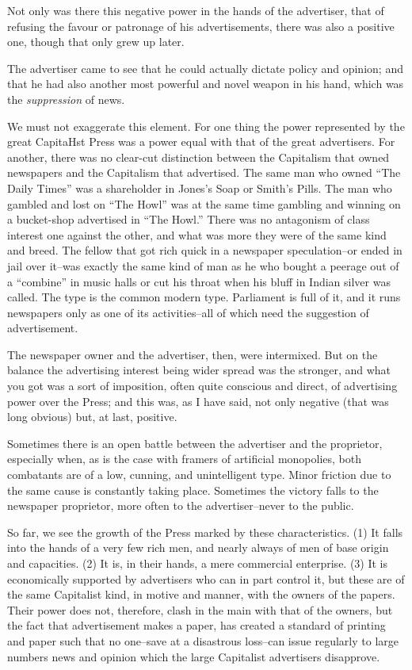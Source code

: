\documentclass{book}
\begin{document}
Not only was there this negative power in the hands of the advertiser, that of refusing the favour or patronage of his advertisements, there was also a positive one, though that only grew up later.

The advertiser came to see that he could actually dictate policy and opinion; and that he had also another most powerful and novel weapon in his hand, which was the \emph{suppression} of news.

We must not exaggerate this element. For one thing the power represented by the great CapitaHst Press was a power equal with that of the great advertisers. For another, there was no clear-cut distinction between the Capitalism that owned newspapers and the Capitalism that advertised. The same man who owned “The Daily Times” was a shareholder in Jones’s Soap or Smith’s Pills. The man who gambled and lost on “The Howl” was at the same time gambling and winning on a bucket-shop advertised in “The Howl.” There was no antagonism of class interest one against the other, and what was more they were of the same kind and breed. The fellow that got rich quick in a newspaper speculation–or ended in jail over it–was exactly the same kind of man as he who bought a peerage out of a “combine” in music halls or cut his throat when his bluff in Indian silver was called. The type is the common modern type. Parliament is full of it, and it runs newspapers only as one of its activities–all of which need the suggestion of advertisement.

The newspaper owner and the advertiser, then, were intermixed. But on the balance the advertising interest being wider spread was the stronger, and what you got was a sort of imposition, often quite conscious and direct, of advertising power over the Press; and this was, as I have said, not only negative (that was long obvious) but, at last, positive.

Sometimes there is an open battle between the advertiser and the proprietor, especially when, as is the case with framers of artificial monopolies, both combatants are of a low, cunning, and unintelligent type. Minor friction due to the same cause is constantly taking place. Sometimes the victory falls to the newspaper proprietor, more often to the advertiser–never to the public.

So far, we see the growth of the Press marked by these characteristics. (1) It falls into the hands of a very few rich men, and nearly always of men of base origin and capacities. (2) It is, in their hands, a mere commercial enterprise. (3) It is economically supported by advertisers who can in part control it, but these are of the same Capitalist kind, in motive and manner, with the owners of the papers. Their power does not, therefore, clash in the main with that of the owners, but the fact that advertisement makes a paper, has created a standard of printing and paper such that no one–save at a disastrous loss–can issue regularly to large numbers news and opinion which the large Capitalist advertisers disapprove.
\end{document}
